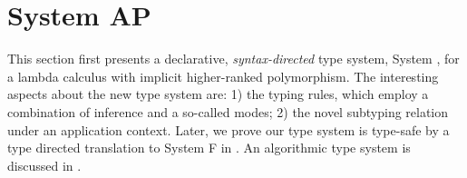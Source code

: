 \chapter{System AP}
\label{chap:BiDirectional}

This section first presents a declarative, \emph{syntax-directed} type system,
System \ap,
for a lambda calculus with implicit higher-ranked polymorphism. The interesting
aspects about the new type system are: 1) the typing rules, which employ a
combination of inference and a so-called \textit{\mode} modes; 2) the novel
subtyping relation under an application context. Later, we prove our type system
is type-safe by a type directed translation to System F in
. An algorithmic type system is discussed in
.











